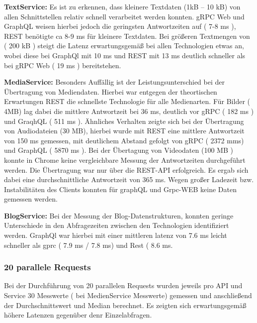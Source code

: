 \clearpage
\textbf{TextService:}  
Es ist zu erkennen, dass kleinere Textdaten (1kB – 10 kB) von allen Schnittstellen relativ schnell verarbeitet werden konnten. gRPC Web und GraphQL weisen hierbei jedoch die geringsten Antwortzeiten auf ( 7-8 ms ), REST benötigte ca 8-9 ms für kleinere Textdaten. Bei größeren Textmengen von ( 200 kB ) steigt die Latenz erwartungsgemäß bei allen Technologien etwas an, wobei diese bei GraphQl mit 10 ms und REST mit 13 ms deutlich schneller als bei gRPC Web ( 19 ms ) bereitstehen. 

\textbf{MediaService:}  
Besonders Auffällig ist der Leistungsunterschied bei der Übertragung von Mediendaten.
Hierbei war entgegen der theortischen Erwartungen REST die schnellste Technologie für alle Medienarten. Für Bilder ( 4MB) lag dabei die mittlere Antwortzeit bei 36 ms, deutlich vor gRPC ( 182 ms ) und GraqhQL ( 511 ms ).
Ähnliches Verhalten zeigte sich bei der Übertragung von Audiodateien (30 MB), hierbei wurde mit REST eine mittlere Antwortzeit von 150 ms gemessen, mit deutlichem Abstand gefolgt von gRPC ( 2372 mms) und GraphQL ( 5870  ms ).
Bei der Übertagung von Videodaten (100 MB ) konnte in Chrome keine vergleichbare Messung der Antwortzeiten durchgeführt werden. Die Übertragung war nur über die REST-API erfolgreich. Es ergab sich dabei eine durchschnittliche Antwortzeit von 365 ms. Wegen großer Ladezeit bzw. Instabilitäten des Clients konnten für graphQL und Grpc-WEB keine Daten gemessen werden. 


\textbf{BlogService:}  
Bei der Messung der Blog-Datenstrukturen, konnten geringe Unterschiede in den Abfragezeiten zwischen den Technologien identifiziert werden. GraphQl war hierbei mit einer mittleren latenz von 7.6 ms leicht schneller als gprc ( 7.9 ms / 7.8 ms) und Rest ( 8.6 ms.

\clearpage
\subsubsection{20 parallele Requests}
Bei der Durchführung von 20 parallelen Requests wurden jeweils pro API und Service 30 Messwerte ( bei MedienService Messwerte) gemessen und anschließend der Durchschnittswert und Median berechnet. Es zeigten sich erwartungsgemäß höhere Latenzen gegenüber denr Einzelabfragen. 

